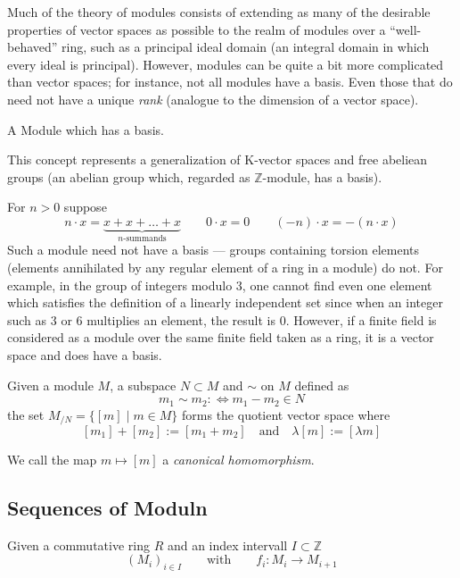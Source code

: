 Much of the theory of modules consists of extending as many of the desirable properties of vector spaces as possible to the realm of modules over a ``well-behaved'' ring, such as a principal ideal domain (an integral domain in which every ideal is principal).
However, modules can be quite a bit more complicated than vector spaces; for instance, not all modules have a basis.
Even those that do need not have a unique \emph{rank} (analogue to the dimension of a vector space).

\begin{definition}
   A Module which has a basis.
\end{definition}
\begin{remark}
   This concept represents a generalization of K-vector spaces and free abeliean groups (an abelian group which, regarded as \(\mathbb{Z}\)-module, has a basis).
\end{remark}
\begin{example}
   For \(n > 0\) suppose
   \[n \cdot x = \underbrace{x + x + \ldots + x}_{n\text{-summands}} \qquad 0 \cdot x = 0 \qquad (-n) \cdot x = -(n \cdot x)\]
   Such a module need not have a basis --- groups containing torsion elements (elements annihilated by any regular element of a ring in a module) do not.
   For example, in the group of integers modulo 3, one cannot find even one element which satisfies the definition of a linearly independent set since when an integer such as 3 or 6 multiplies an element, the result is 0.
   However, if a finite field is considered as a module over the same finite field taken as a ring, it is a vector space and does have a basis.
\end{example}

\begin{definition}
   Given a module \(M\), a subspace \(N \subset M\) and \(\sim\) on \(M\) defined as
   \[m_1 \sim m_2 :\iff m_1 - m_2 \in N\]
   the set \(M_{/N} = \{[m] \mid m \in M\}\) forms the quotient vector space where
   \[[m_1] + [m_2] := [m_1 + m_2] \quad\text{and}\quad \lambda [m] := [\lambda m]\]
\end{definition}
\begin{remark}
   We call the map \(m \mapsto [m]\) a \emph{canonical homomorphism}.
\end{remark}

\subsection{Sequences of Moduln}
\begin{definition}
   Given a commutative ring \(R\) and an index intervall \(I \subset \mathbb{Z}\)
   \[(M_i)_{i \in I} \qquad\text{with}\qquad f_i: M_i \to M_{i+1}\]
\end{definition}

